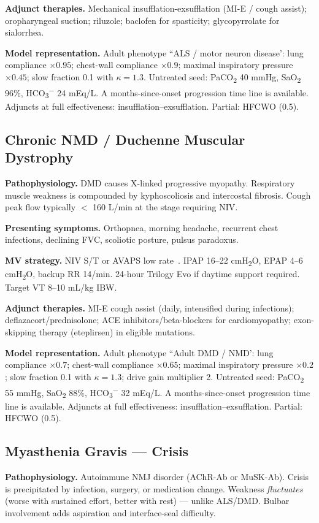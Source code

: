 \textbf{Adjunct therapies.} Mechanical insufflation-exsufflation (MI-E / cough assist); oropharyngeal suction; riluzole; baclofen for spasticity; glycopyrrolate for sialorrhea.

\textbf{Model representation.} Adult phenotype ``ALS / motor neuron disease': lung compliance $\times0.95$; chest-wall compliance $\times0.9$; maximal inspiratory pressure $\times0.45$; slow fraction 0.1 with $\kappa=1.3$. Untreated seed: PaCO\textsubscript{2} 40 mmHg, SaO\textsubscript{2} 96\%, HCO\textsubscript{3}\textsuperscript{$-$} 24 mEq/L. A months-since-onset progression time line is available. Adjuncts at full effectiveness: insufflation--exsufflation. Partial: HFCWO (0.5).

\subsection{Chronic NMD / Duchenne Muscular Dystrophy}
\textbf{Pathophysiology.} DMD causes X-linked progressive myopathy. Respiratory muscle weakness is compounded by kyphoscoliosis  and intercostal fibrosis. Cough peak flow typically $<$ 160 L/min at the stage requiring NIV.

\textbf{Presenting symptoms.} Orthopnea, morning headache, recurrent chest infections, declining FVC, scoliotic posture, pulsus paradoxus.

\textbf{MV strategy.} NIV S/T or AVAPS low rate~\citep{finder2004}. IPAP 16--22 cmH\textsubscript{2}O, EPAP 4--6 cmH\textsubscript{2}O, backup RR 14/min. 24-hour Trilogy Evo if daytime support required. Target VT 8--10 mL/kg IBW.

\textbf{Adjunct therapies.} MI-E cough assist (daily, intensified during infections); deflazacort/prednisolone; ACE inhibitors/beta-blockers for cardiomyopathy; exon-skipping therapy (eteplirsen) in eligible mutations.

\textbf{Model representation.} Adult phenotype ``Adult DMD / NMD': lung compliance $\times0.7$; chest-wall compliance $\times0.65$; maximal inspiratory pressure $\times0.2$; slow fraction 0.1 with $\kappa=1.3$; drive gain multiplier 2. Untreated seed: PaCO\textsubscript{2} 55 mmHg, SaO\textsubscript{2} 88\%, HCO\textsubscript{3}\textsuperscript{$-$} 32 mEq/L. A months-since-onset progression time line is available. Adjuncts at full effectiveness: insufflation--exsufflation. Partial: HFCWO (0.5).

\subsection{Myasthenia Gravis --- Crisis}
\textbf{Pathophysiology.} Autoimmune NMJ disorder (AChR-Ab or MuSK-Ab). Crisis is precipitated by infection, surgery, or medication change. Weakness \emph{fluctuates} (worse with sustained effort, better with rest) --- unlike ALS/DMD. Bulbar involvement adds aspiration and interface-seal difficulty.


